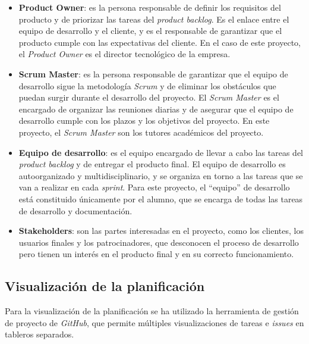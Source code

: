 \begin{itemize}
	\item \textbf{Product Owner}: es la persona responsable de definir los
		requisitos del producto y de priorizar las tareas del
		\textit{product backlog}. Es el enlace entre el equipo de desarrollo y
		el cliente, y es el responsable de garantizar que el producto cumple con
		las expectativas del cliente. En el caso de este proyecto, el
		\textit{Product Owner} es el director tecnológico de la empresa.
	\item \textbf{Scrum Master}: es la persona responsable de garantizar que el
		equipo de desarrollo sigue la metodología \textit{Scrum} y de eliminar
		los obstáculos que puedan surgir durante el desarrollo del proyecto. El
		\textit{Scrum Master} es el encargado de organizar las reuniones diarias
		y de asegurar que el equipo de desarrollo cumple con los plazos y los
		objetivos del proyecto. En este proyecto, el \textit{Scrum Master} son
		los tutores académicos del proyecto.
	\item \textbf{Equipo de desarrollo}: es el equipo encargado de llevar a cabo
		las tareas del \textit{product backlog} y de entregar el producto final.
		El equipo de desarrollo es autoorganizado y multidisciplinario, y se
		organiza en torno a las tareas que se van a realizar en cada
		\textit{sprint}. Para este proyecto, el ``equipo'' de desarrollo está
		constituido únicamente por el alumno, que se encarga de todas las tareas
		de desarrollo y documentación.
	\item \textbf{Stakeholders}: son las partes interesadas en el proyecto, como
		los clientes, los usuarios finales y los patrocinadores, que desconocen
		el proceso de desarrollo pero tienen un interés en el producto final y
		en su correcto funcionamiento.
\end{itemize}

\subsection{Visualización de la planificación}\label{subsec:visual_planif}
Para la visualización de la planificación se ha utilizado la herramienta de
gestión de proyecto de \textit{GitHub}, que permite múltiples visualizaciones de
tareas e \textit{issues} en tableros separados.

